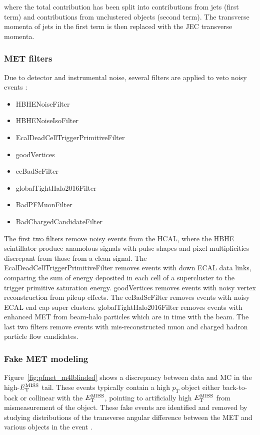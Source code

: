 where the total contribution has been split into contributions from jets (first term) and contributions from unclustered objects (second term). The transverse momenta of jets in the first term is then replaced with the JEC transverse momenta.

\subsubsection{MET filters}

Due to detector and instrumental noise, several filters are applied to veto noisy events \cite{mettwiki}:

\begin{itemize}
\item HBHENoiseFilter
\item HBHENoiseIsoFilter 
\item EcalDeadCellTriggerPrimitiveFilter 
\item goodVertices 
\item eeBadScFilter 
\item globalTightHalo2016Filter 
\item BadPFMuonFilter 
\item BadChargedCandidateFilter
\end{itemize}

The first two filters remove noisy events from the HCAL, where the HBHE scintillator produce anamolous signals with pulse shapes and pixel multiplicities discrepant from those from a clean signal. The EcalDeadCellTriggerPrimitiveFilter removes events with down ECAL data links, comparing the sum of energy deposited in each cell of a supercluster to the trigger primitive saturation energy. goodVertices removes events with noisy vertex reconstruction from pileup effects. The eeBadScFilter removes events with noisy ECAL end cap super clusters. globalTightHalo2016Filter removes events with enhanced MET from beam-halo particles which are in time with the beam. The last two filters remove events with mis-reconstructed muon and charged hadron particle flow candidates.

\subsubsection{Fake MET modeling}\label{sec:fakemet}

Figure~\ref{fig:pfmet_m4lblinded} shows a discrepancy between data and MC in the high-$E_{\rm{T}}^{\rm{MISS}}$ tail. These events typically contain a high $p_T$ object either back-to-back or collinear with the $E_{\rm{T}}^{\rm{MISS}}$, pointing to artificially high $E_{\rm{T}}^{\rm{MISS}}$ from mismeasurement of the object. These fake events are identified and removed by studying distributions of the transverse angular difference between the MET and various objects in the event \cite{CMS-AN-15-203}.

